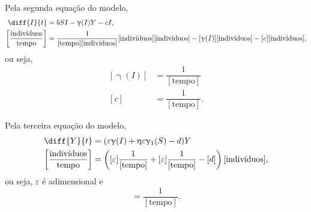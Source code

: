 \documentclass{article}
\begin{document}
Pela segunda equação do modelo,
\begin{equation*}
\begin{split}
    \diff{I}{t} & = bSI - \upgamma(I)Y - cI, \\
    \left[ \dfrac{\text{indivíduos}}{\text{tempo}} \right] & = \dfrac{1}{[\text{tempo}] [\text{indivíduos}]} \text{[indivíduos]} \text{[indivíduos]}- [\upgamma(I)] [\text{indivíduos}] - [c] [\text{indivíduos}],
\end{split}
\end{equation*}
ou seja,
\begin{equation*}
\begin{split}
    [\upgamma(I)] & = \dfrac{1}{[\text{tempo}]} \\
    [c] & = \dfrac{1}{[\text{tempo}]}.
\end{split}
\end{equation*}

Pela terceira equação do modelo,
\begin{equation*}
\begin{split}
    \diff{Y}{t} & = (\varepsilon \upgamma(I) + \upeta \varepsilon \upgamma_1(S) - d)Y \\
    \left[ \dfrac{\text{indivíduos}}{\text{tempo}} \right] & = \left([\varepsilon] \dfrac{1}{[\text{tempo}]} + [\varepsilon] \dfrac{1}{[\text{tempo}]} - [d] \right)[\text{indivíduos}],
\end{split}
\end{equation*}
ou seja, $\varepsilon$ é adimensional e 
\begin{equation*}
    [d] = \dfrac{1}{[\text{tempo}]}.
\end{equation*}

\printbibliography
\end{document}
